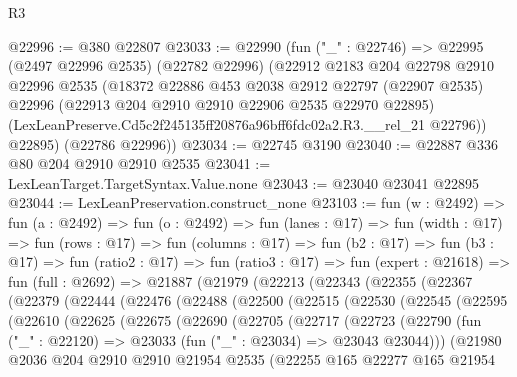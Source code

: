 \begin{lexlean}{R3}
\begin{coremodule}
@22996 := @380 @22807
@23033 := @22990
    (fun ("_" : @22746) =>
    @22995
      (@2497 @22996 @2535)
      (@22782 @22996)
      (@22912
        @2183
        @204
        @22798
        @2910
        @22996
        @2535
        (@18372
          @22886
          @453
          @2038
          @2912
          @22797
          (@22907 @2535)
          @22996
          (@22913 @204 @2910 @2910 @22906 @2535 @22970 @22895)
          (LexLeanPreserve.Cd5c2f245135ff20876a96bff6fdc02a2.R3.__rel_21 @22796))
        @22895)
      (@22786 @22996))
@23034 := @22745 @3190
@23040 := @22887 @336 @80 @204 @2910 @2910 @2535
@23041 := LexLeanTarget.TargetSyntax.Value.none
@23043 := @23040 @23041 @22895
@23044 := LexLeanPreservation.construct_none
@23103 := fun (w : @2492) =>
  fun (a : @2492) =>
  fun (o : @2492) =>
  fun (lanes : @17) =>
  fun (width : @17) =>
  fun (rows : @17) =>
  fun (columns : @17) =>
  fun (b2 : @17) =>
  fun (b3 : @17) =>
  fun (ratio2 : @17) =>
  fun (ratio3 : @17) =>
  fun (expert : @21618) =>
  fun (full : @2692) =>
  @21887
    (@21979
      (@22213
        (@22343
          (@22355
            (@22367
              (@22379
                (@22444
                  (@22476
                    (@22488
                      (@22500
                        (@22515
                          (@22530
                            (@22545
                              (@22595
                                (@22610
                                  (@22625
                                    (@22675
                                      (@22690
                                        (@22705
                                          (@22717
                                            (@22723
                                              (@22790
                                                (fun ("_" : @22120) =>
                                                @23033 (fun ("_" : @23034) => @23043 @23044)))
                                              (@21980
                                                @2036
                                                @204
                                                @2910
                                                @2910
                                                @21954
                                                @2535
                                                (@22255
                                                  @165
                                                  @22277
                                                  @165
                                                  @21954

\end{coremodule}
\end{lexlean}
